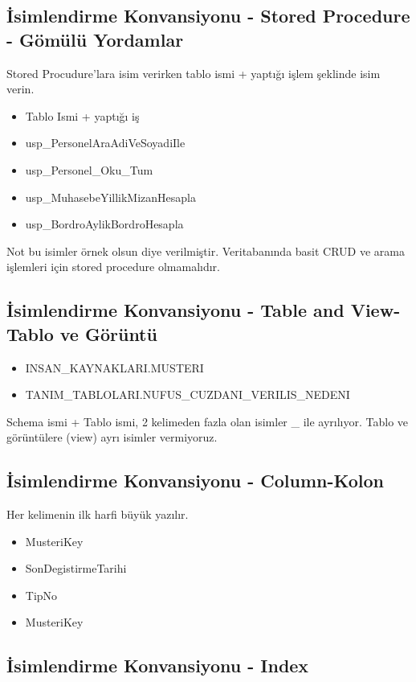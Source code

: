 \documentclass[10pt,a4paper,draft]{article}
\begin{document}
\subsection{İsimlendirme Konvansiyonu - Stored Procedure - Gömülü Yordamlar }  

Stored Procudure'lara isim verirken tablo ismi + yaptığı işlem şeklinde  isim verin.
    

\begin{itemize}
\item Tablo Ismi + yaptığı iş 
\item usp\_PersonelAraAdiVeSoyadiIle 
\item usp\_Personel\_Oku\_Tum 
\item usp\_MuhasebeYillikMizanHesapla
\item usp\_BordroAylikBordroHesapla
\end{itemize}

Not bu isimler örnek olsun diye verilmiştir. 
Veritabanında basit CRUD ve arama işlemleri için stored procedure olmamalıdır.

\subsection{İsimlendirme Konvansiyonu - Table and View-Tablo ve Görüntü}  

\begin{itemize}
\item INSAN\_KAYNAKLARI.MUSTERI 
\item TANIM\_TABLOLARI.NUFUS\_CUZDANI\_VERILIS\_NEDENI
\end{itemize}  

Schema ismi + Tablo ismi, 2 kelimeden fazla olan isimler \_ ile ayrılıyor. 
Tablo ve görüntülere (view) ayrı isimler vermiyoruz.		  

\subsection{İsimlendirme Konvansiyonu - Column-Kolon}  
Her kelimenin ilk harfi büyük yazılır. 
\begin{itemize}
\item MusteriKey 
\item SonDegistirmeTarihi
\item TipNo
\item MusteriKey
\end{itemize}  


\subsection{İsimlendirme Konvansiyonu - Index}  
\end{document}
